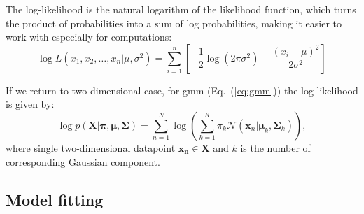 The log-likelihood is the natural logarithm of the likelihood function, which turns the product of probabilities into a sum of log probabilities, making it easier to work with especially for computations:
\begin{equation}
    \log L(x_1, x_2, \ldots, x_n | \mu, \sigma^2) = \sum_{i=1}^{n} \left[ -\frac{1}{2}\log(2\pi\sigma^2) -\frac{(x_i - \mu)^2}{2\sigma^2} \right]
\end{equation}

If we return to two-dimensional case, for \gls{gmm} (Eq.~(\ref{eq:gmm})) the log-likelihood is given by:
\begin{equation}
\log p(\mathbf{X} | \boldsymbol{\pi}, \boldsymbol{\mu}, \boldsymbol{\Sigma}) = \sum_{n=1}^N \log \left( \sum_{k=1}^K \pi_k \mathcal{N}(\mathbf{x}_n | \boldsymbol{\mu}_k, \boldsymbol{\Sigma}_k) \right) {,}
\label{eq:loglik}
\end{equation}
where single two-dimensional datapoint $\mathbf{x_n} \in \mathbf{X}$ and \(k\) is the number of corresponding Gaussian component.

\subsection{Model fitting}

